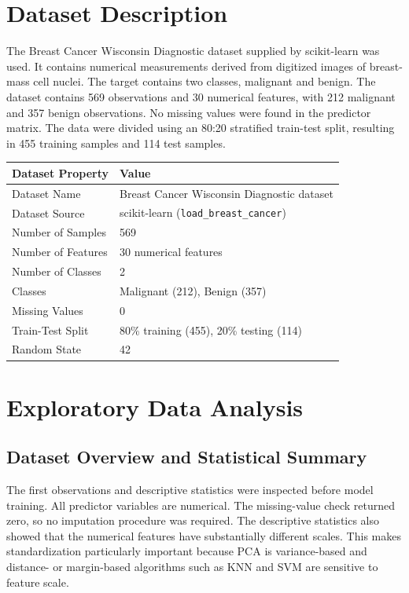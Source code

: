 \documentclass[12pt,a4paper]{article}
\begin{document}
\section{Dataset Description}
The Breast Cancer Wisconsin Diagnostic dataset supplied by scikit-learn was used. It contains numerical measurements derived from digitized images of breast-mass cell nuclei. The target contains two classes, malignant and benign. The dataset contains 569 observations and 30 numerical features, with 212 malignant and 357 benign observations. No missing values were found in the predictor matrix. The data were divided using an 80:20 stratified train-test split, resulting in 455 training samples and 114 test samples.

\begin{longtable}{|p{6cm}|p{8cm}|}
\hline
\textbf{Dataset Property} & \textbf{Value}\\ \hline
Dataset Name & Breast Cancer Wisconsin Diagnostic dataset\\ \hline
Dataset Source & scikit-learn (\texttt{load\_breast\_cancer})\\ \hline
Number of Samples & 569\\ \hline
Number of Features & 30 numerical features\\ \hline
Number of Classes & 2\\ \hline
Classes & Malignant (212), Benign (357)\\ \hline
Missing Values & 0\\ \hline
Train-Test Split & 80\% training (455), 20\% testing (114)\\ \hline
Random State & 42\\ \hline
\end{longtable}

\section{Exploratory Data Analysis}

\subsection{Dataset Overview and Statistical Summary}
The first observations and descriptive statistics were inspected before model training. All predictor variables are numerical. The missing-value check returned zero, so no imputation procedure was required. The descriptive statistics also showed that the numerical features have substantially different scales. This makes standardization particularly important because PCA is variance-based and distance- or margin-based algorithms such as KNN and SVM are sensitive to feature scale.
\end{document}
